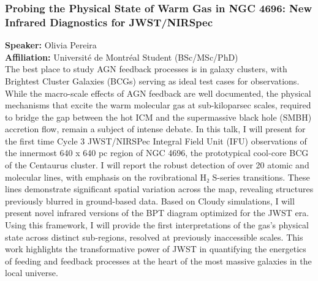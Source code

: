 \subsubsection*{Probing the Physical State of Warm Gas in NGC 4696: New Infrared Diagnostics for JWST/NIRSpec}
\textbf{Speaker:} Olivia Pereira \\
\textbf{Affiliation:} Université de Montréal \textperiodcentered{} Student (BSc/MSc/PhD)\\
The best place to study AGN feedback processes is in galaxy clusters, with Brightest Cluster Galaxies (BCGs) serving as ideal test cases for observations. While the macro-scale effects of AGN feedback are well documented, the physical mechanisms that excite the warm molecular gas at sub-kiloparsec scales, required to bridge the gap between the hot ICM and the supermassive black hole (SMBH) accretion flow, remain a subject of intense debate. 
In this talk, I will present for the first time Cycle 3 JWST/NIRSPec Integral Field Unit (IFU) observations of the innermost 640 x 640 pc region of NGC 4696, the prototypical cool-core BCG of the Centaurus cluster. I will report the robust detection of over 20 atomic and molecular lines, with emphasis on the rovibrational H₂ S-series transitions. These lines demonstrate significant spatial variation across the map, revealing structures previously blurred in ground-based data. Based on Cloudy simulations, I will present novel infrared versions of the BPT diagram optimized for the JWST era. Using this framework, I will provide the first interpretations of the gas’s physical state across distinct sub-regions, resolved at previously inaccessible scales. This work highlights the transformative power of JWST in quantifying the energetics of feeding and feedback processes at the heart of the most massive galaxies in the local universe.

\hypertarget{abs-42}{}
